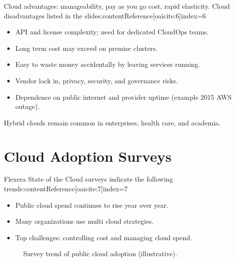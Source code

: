 \documentclass[11pt]{article}
\begin{document}
Cloud advantages: manageability, pay as you go cost, rapid elasticity.  
Cloud disadvantages listed in the slides:contentReference[oaicite:6]{index=6}

\begin{itemize}[itemsep=0pt]
  \item API and license complexity; need for dedicated CloudOps teams.
  \item Long term cost may exceed on premise clusters.
  \item Easy to waste money accidentally by leaving services running.
  \item Vendor lock in, privacy, security, and governance risks.
  \item Dependence on public internet and provider uptime (example 2015 AWS outage). 
\end{itemize}

Hybrid clouds remain common in enterprises, health care, and academia.

\section{Cloud Adoption Surveys}

Flexera State of the Cloud surveys indicate the following trends:contentReference[oaicite:7]{index=7}

\begin{itemize}[itemsep=0pt]
  \item Public cloud spend continues to rise year over year.
  \item Many organizations use multi cloud strategies.
  \item Top challenges: controlling cost and managing cloud spend.
\end{itemize}

\begin{figure}[h]
  \centering
  \caption{Survey trend of public cloud adoption (illustrative).}
\end{figure}
\end{document}
